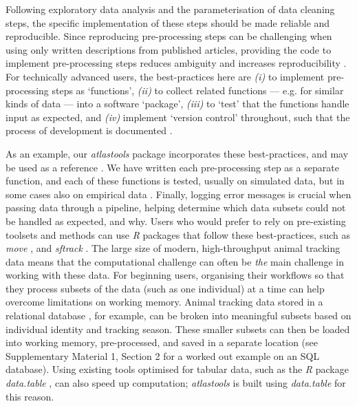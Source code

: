 Following exploratory data analysis and the parameterisation of data cleaning steps, the specific implementation of these steps should be made reliable and reproducible.
Since reproducing pre-processing steps can be challenging when using only written descriptions from published articles, providing the code to implement pre-processing steps reduces ambiguity and increases reproducibility \citep{haddaway2015}.
For technically advanced users, the best-practices here are \textit{(i)} to implement pre-processing steps as `functions', \textit{(ii)} to collect related functions --- e.g. for similar kinds of data --- into a software `package', \textit{(iii)} to `test' that the functions handle input as expected, and \textit{(iv)} implement `version control' throughout, such that the process of development is documented \citep[Fig.~\ref{preproc_fig_01};][]{wickham2015,alston2020,perez-riverol2016}.

As an example, our \textit{atlastools} package incorporates these best-practices, and may be used as a reference \citep[][]{gupte2020a}.
We have written each pre-processing step as a separate function, and each of these functions is tested, usually on simulated data, but in some cases also on empirical data \citep[][see the directory \textit{tests/} in the associated Zenodo repository]{wickham2015}.
Finally, logging error messages is crucial when passing data through a pipeline, helping determine which data subsets could not be handled as expected, and why.
Users who would prefer to rely on pre-existing toolsets and methods can use \textit{R} packages that follow these best-practices, such as \textit{move} \citep{kranstauber2011}, and \textit{sftrack} \citep{boone2020}.
The large size of modern, high-throughput animal tracking data means that the computational challenge can often be \textit{the} main challenge in working with these data.
For beginning users, organising their workflows so that they process subsets of the data (such as one individual) at a time can help overcome limitations on working memory.
Animal tracking data stored in a relational database \citep[e.g. SQL databases][]{codd1970}, for example, can be broken into meaningful subsets based on individual identity and tracking season.
These smaller subsets can then be loaded into working memory, pre-processed, and saved in a separate location (see Supplementary Material 1, Section 2 for a worked out example on an SQL database).
Using existing tools optimised for tabular data, such as the \textit{R} package \textit{data.table} \citep{dowle2020}, can also speed up computation; \textit{atlastools} is built using \textit{data.table} for this reason.

